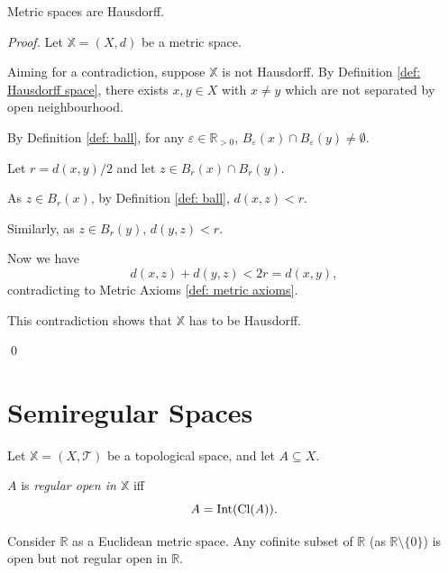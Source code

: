 \begin{proposition}
	Metric spaces are Hausdorff.
	
	\begin{proof}
		Let $\mathbb X = (X, d)$ be a metric space.
		
		Aiming for a contradiction, suppose $\mathbb X$ is not Hausdorff. By Definition \ref{def: Hausdorff space}, there exists $x,y \in X$ with $x \ne y$ which are not separated by open neighbourhood.
		
		By Definition \ref{def: ball}, for any $\varepsilon \in \mathbb R_{> 0}$, $B_\varepsilon(x) \cap B_\varepsilon(y) \ne \emptyset$.
		
		Let $r = d(x,y) / 2$ and let $z \in B_r(x) \cap B_r(y)$.
		
		As $z \in B_r(x)$, by Definition \ref{def: ball}, $d(x,z) < r$.
		
		Similarly, as $z \in B_r(y)$, $d(y,z) < r$.
		
		Now we have
		$$
		d(x,z) + d(y,z) < 2r = d(x,y),
		$$
		contradicting to Metric Axioms \ref{def: metric axioms}.
		
		This contradiction shows that $\mathbb X$ has to be Hausdorff.
		
		\qed
	\end{proof}
\end{proposition}


\section{Semiregular Spaces}


\begin{definition}
	\label{def: regular open set}
	Let $\mathbb X = (X, \mathcal T)$ be a topological space, and let $A \subseteq X$.
	
	$A$ is \textit{regular open in $\mathbb X$} iff
	$$
	A = \mathrm{Int}(\mathrm{Cl}(A)).
	$$
\end{definition}


\begin{example}
	Consider $\mathbb R$ as a Euclidean metric space. Any cofinite subset of $\mathbb R$ (as $\mathbb R \setminus \{0\}$) is open but not regular open in $\mathbb R$.
\end{example}


